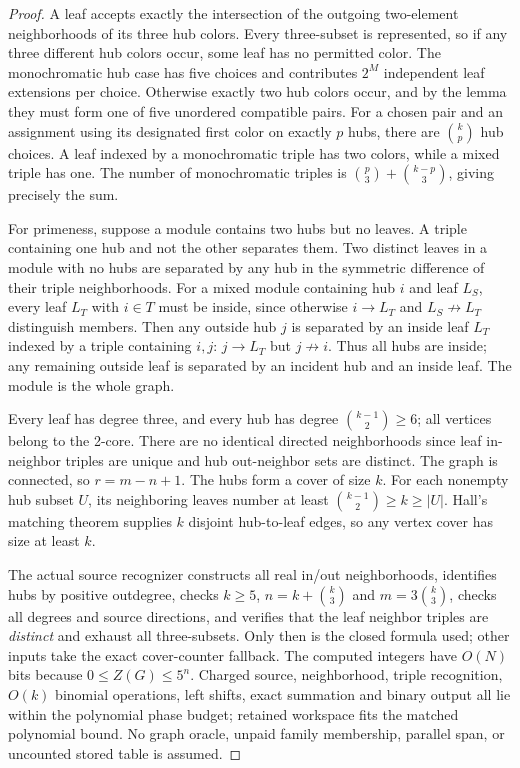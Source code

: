 \documentclass[11pt]{article}
\begin{document}
\begin{proof}
A leaf accepts exactly the intersection of the outgoing
two-element neighborhoods of its three hub colors.
Every three-subset is represented, so if any three different
hub colors occur, some leaf has no permitted color.
The monochromatic hub case has five choices and contributes
$2^M$ independent leaf extensions per choice.
Otherwise exactly two hub colors occur, and by the lemma
they must form one of five unordered compatible pairs.
For a chosen pair and an assignment using its designated
first color on exactly $p$ hubs, there are $\binom{k}{p}$
hub choices. A leaf indexed by a monochromatic triple
has two colors, while a mixed triple has one. The number
of monochromatic triples is
$\binom p3+\binom{k-p}3$, giving precisely the sum.

For primeness, suppose a module contains two hubs but no
leaves. A triple containing one hub and not the other
separates them. Two distinct leaves in a module with no
hubs are separated by any hub in the symmetric difference
of their triple neighborhoods. For a mixed module
containing hub $i$ and leaf $L_S$, every leaf $L_T$ with
$i\in T$ must be inside, since otherwise $i\to L_T$
and $L_S\not\to L_T$ distinguish members. Then any
outside hub $j$ is separated by an inside leaf
$L_T$ indexed by a triple containing $i,j$:
$j\to L_T$ but $j\not\to i$. Thus all hubs are inside;
any remaining outside leaf is separated by an incident
hub and an inside leaf. The module is the whole graph.

Every leaf has degree three, and every hub has degree
$\binom{k-1}{2}\ge6$; all vertices belong to the 2-core.
There are no identical directed neighborhoods since leaf
in-neighbor triples are unique and hub out-neighbor sets
are distinct. The graph is connected, so $r=m-n+1$.
The hubs form a cover of size $k$. For each nonempty
hub subset $U$, its neighboring leaves number at least
$\binom{k-1}{2}\ge k\ge|U|$. Hall's matching theorem
supplies $k$ disjoint hub-to-leaf edges, so any vertex
cover has size at least $k$.

The actual source recognizer constructs all real in/out
neighborhoods, identifies hubs by positive outdegree,
checks $k\ge5$, $n=k+\binom{k}{3}$ and $m=3\binom{k}{3}$,
checks all degrees and source directions, and verifies
that the leaf neighbor triples are \emph{distinct} and
exhaust all three-subsets. Only then is the closed formula
used; other inputs take the exact cover-counter fallback.
The computed integers have $O(N)$ bits because
$0\le Z(G)\le5^n$. Charged source, neighborhood,
triple recognition, $O(k)$ binomial operations,
left shifts, exact summation and binary output all lie
within the polynomial phase budget; retained workspace
fits the matched polynomial bound. No graph oracle,
unpaid family membership, parallel span, or uncounted
stored table is assumed.
\end{proof}
\end{document}
